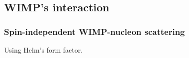 \subsection{WIMP's interaction} \label{sec:wimp}

\subsubsection{Spin-independent WIMP-nucleon scattering}

Using Helm's form factor\cite{helm_inelastic_1956}.
